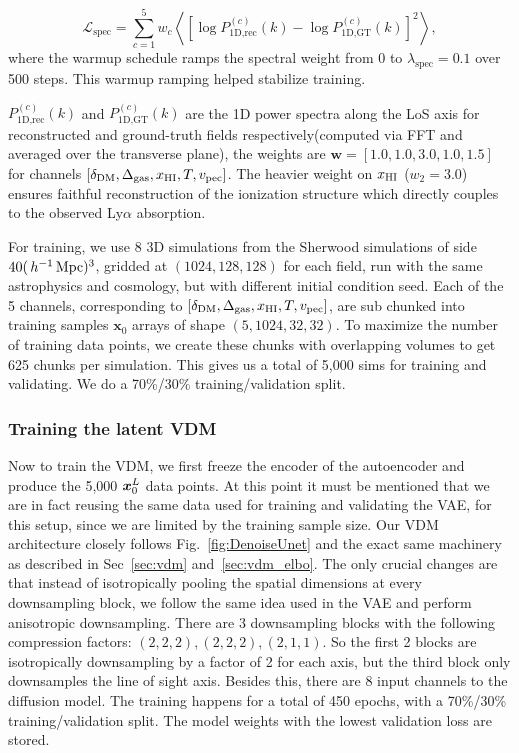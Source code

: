 \begin{equation}
\mathcal{L}_{\text{spec}} = \sum_{c=1}^{5} w_c \left\langle \left[\log P_{\text{1D,rec}}^{(c)}(k) - \log P_{\text{1D,GT}}^{(c)}(k)\right]^2 \right\rangle,
\label{eq:spectral_loss}
\end{equation}
where the warmup schedule ramps the spectral weight from 0 to $\lambda_{\text{spec}} = 0.1$ over 500 steps. This warmup ramping helped stabilize training.

$P_{\text{1D,rec}}^{(c)}(k)$ and $P_{\text{1D,GT}}^{(c)}(k)$ are the 1D power spectra along the LoS axis for reconstructed and ground-truth fields respectively(computed via FFT and averaged over the transverse plane), the weights are $\bm{w} = [1.0, 1.0, 3.0, 1.0, 1.5]$ for channels $[\delta_{\rm DM}, \Delta_{\rm gas}, x_{\rm HI}, T, v_{\rm pec}]$. The heavier weight on $x_{\rm HI}$ ($w_2 = 3.0$) ensures faithful reconstruction of the ionization structure which directly couples to the observed Ly$\alpha$ absorption.

\vspace{\baselineskip}

For training, we use 8 3D simulations from the Sherwood simulations of side $40(\,h^{-1}\,\mathrm{Mpc})^3$, gridded at $(1024,128,128)$ for each field, run with the same astrophysics and cosmology, but with different initial condition seed. Each of the 5 channels, corresponding to $[\delta_{\rm DM}, \Delta_{\rm gas}, x_{\rm HI}, T, v_{\rm pec}]$, are sub chunked into training samples $\bm{x}_0$ arrays of shape $(5,1024,32,32)$. To maximize the number of training data points, we create these chunks with overlapping volumes to get 625 chunks per simulation. This gives us a total of 5,000 sims for training and validating. We do a 70\%/30\% training/validation split.

\subsubsection{Training the latent VDM}
\label{sec:latent_vdm}
Now to train the VDM, we first freeze the encoder of the autoencoder and produce the 5,000 $\bm{x}_0^L$ data points. At this point it must be mentioned that we are in fact reusing the same data used for training and validating the VAE, for this setup, since we are limited by the training sample size. Our VDM architecture closely follows Fig.~\ref{fig:DenoiseUnet} and the exact same machinery as described in Sec~\ref{sec:vdm} and~\ref{sec:vdm_elbo}. The only crucial changes are that instead of isotropically pooling the spatial dimensions at every downsampling block, we follow the same idea used in the VAE and perform anisotropic downsampling. There are 3 downsampling blocks with the following compression factors: $(2,2,2),(2,2,2),(2,1,1)$. So the first 2 blocks are isotropically downsampling by a factor of 2 for each axis, but the third block only downsamples the line of sight axis. Besides this, there are 8 input channels to the diffusion model. The training happens for a total of 450 epochs, with a 70\%/30\% training/validation split. The model weights with the lowest validation loss are stored.

